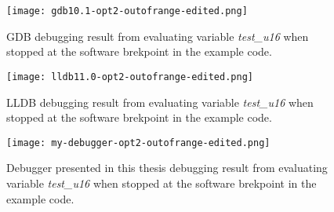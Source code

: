 \begin{figure}[h]
	\centering
	\texttt{[image: gdb10.1-opt2-outofrange-edited.png]}
	\caption{\gls{GDB} debugging result from evaluating variable \emph{test\_u16} when stopped at the software brekpoint in the example code.}
    	\label{fig:gdboutofrange}
\end{figure}


\begin{figure}[h]
	\centering
	\texttt{[image: lldb11.0-opt2-outofrange-edited.png]}
	\caption{\gls{LLDB} debugging result from evaluating variable \emph{test\_u16} when stopped at the software brekpoint in the example code.}
	\label{fig:lldboutofrange}
\end{figure}


\begin{figure}[h]
    \centering
    \texttt{[image: my-debugger-opt2-outofrange-edited.png]}
	\caption{Debugger presented in this thesis debugging result from evaluating variable \emph{test\_u16} when stopped at the software brekpoint in the example code.}
    \label{fig:mydebuggeroutofrange}
\end{figure}

